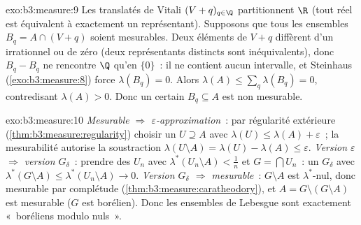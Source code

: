 \begin{solution}{exo:b3:measure:9}
Les translatés de Vitali $(V + q)_{q\in\Q}$ partitionnent
$\R$ (tout réel est équivalent à exactement un
représentant). Supposons que tous les ensembles $B_q = A
\cap (V + q)$ soient mesurables. Deux éléments de $V + q$
diffèrent d'un irrationnel ou de zéro (deux représentants
distincts sont inéquivalents), donc $B_q - B_q$ ne
rencontre $\Q$ qu'en $\{0\}$~: il ne contient aucun
intervalle, et Steinhaus (\cref{exo:b3:measure:8}) force
$\lambda(B_q) = 0$. Alors $\lambda(A) \leq
\sum_{q}\lambda(B_q) = 0$, contredisant $\lambda(A) > 0$.
Donc un certain $B_q \subseteq A$ est non mesurable.
\end{solution}

\begin{solution}{exo:b3:measure:10}
\emph{Mesurable $\Rightarrow$ $\varepsilon$-approximation}~:
par régularité extérieure
(\cref{thm:b3:measure:regularity}) choisir un  $U
\supseteq A$ avec $\lambda(U) \leq \lambda(A) +
\varepsilon$~; la mesurabilité autorise la soustraction
$\lambda(U\setminus A) = \lambda(U) - \lambda(A) \leq
\varepsilon$. \emph{Version $\varepsilon$ $\Rightarrow$
version $G_\delta$}~: prendre des $U_n$ avec
$\lambda^*(U_n\setminus A) < \frac1n$ et $G = \bigcap
U_n$~: un $G_\delta$ avec $\lambda^*(G\setminus A) \leq
\lambda^*(U_n\setminus A) \to 0$. \emph{Version $G_\delta$
$\Rightarrow$ mesurable}~: $G\setminus A$ est
$\lambda^*$-nul, donc mesurable par complétude
(\cref{thm:b3:measure:caratheodory}), et $A = G \setminus
(G\setminus A)$ est mesurable ($G$ est borélien). Donc les
ensembles de Lebesgue sont exactement «~boréliens modulo
nuls~».
\end{solution}

